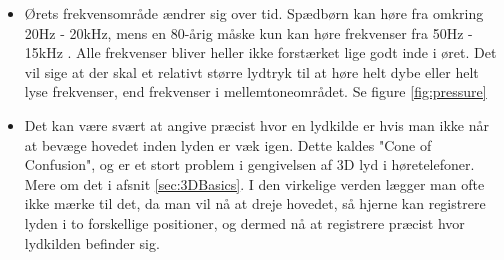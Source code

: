 \begin{itemize}
	\item Ørets frekvensområde ændrer sig over tid. Spædbørn kan høre fra omkring 20Hz - 20kHz, mens en 80-årig måske kun kan høre frekvenser fra 50Hz - 15kHz . Alle frekvenser bliver heller ikke forstærket lige godt inde i øret. Det vil sige at der skal et relativt større lydtryk til at høre helt dybe eller helt lyse frekvenser, end frekvenser i mellemtoneområdet. Se figure \ref{fig:pressure}
	
	
	\item Det kan være svært at angive præcist hvor en lydkilde er hvis man ikke når at bevæge hovedet inden lyden er væk igen. Dette kaldes "Cone of Confusion", og er et stort problem i gengivelsen af 3D lyd i høretelefoner. Mere om det i afsnit \ref{sec:3DBasics}. I den virkelige verden lægger man ofte ikke mærke til det, da man vil nå at dreje hovedet, så hjerne kan registrere lyden i to forskellige positioner, og dermed nå at registrere præcist hvor lydkilden befinder sig.
\end{itemize}